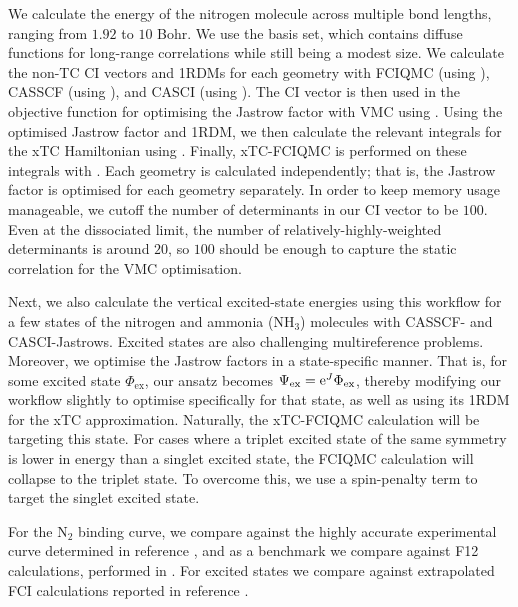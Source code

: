 We calculate the energy of the nitrogen molecule across multiple bond lengths, ranging from $1.92$ to $10$ Bohr. We use the \avtz basis set, which contains diffuse functions for long-range correlations while still being a modest size. We calculate the non-TC CI vectors and \glspl{1RDM} for each geometry with FCIQMC (using \neci),\supercite{gutherNECI2020} CASSCF (using \molpro),\supercite{wernerMOLPRO,wernerMolpro2012,wernerMolproQuantumChemistry2020} and CASCI (using \pyscf).\supercite{sunPySCF2018} The CI vector is then used in the objective function for optimising the Jastrow factor with VMC using \casino.\supercite{needsVariational2020} Using the optimised Jastrow factor and 1RDM, we then calculate the relevant integrals for the xTC Hamiltonian using \pytchint. Finally, xTC-FCIQMC is performed on these integrals with \neci. Each geometry is calculated independently; that is, the Jastrow factor is optimised for each geometry separately. In order to keep memory usage manageable, we cutoff the number of determinants in our CI vector to be $100$. Even at the dissociated limit, the number of relatively-highly-weighted determinants is around $20$, so $100$ should be enough to capture the static correlation for the VMC optimisation.

Next, we also calculate the vertical excited-state energies using this workflow for a few states of the nitrogen and ammonia (NH$_3$) molecules with CASSCF- and CASCI-Jastrows. Excited states are also challenging multireference problems. Moreover, we optimise the Jastrow factors in a state-specific manner. That is, for some excited state $\Phi_\mathrm{ex}$, our ansatz becomes $\Psi_\mathrm{ex} = \mathrm{e}^J\Phi_\mathrm{ex}$, thereby modifying our workflow slightly to optimise specifically for that state, as well as using its 1RDM for the xTC approximation. Naturally, the xTC-FCIQMC calculation will be targeting this state. For cases where a triplet excited state of the same symmetry is lower in energy than a singlet excited state, the FCIQMC calculation will collapse to the triplet state. To overcome this, we use a spin-penalty term to target the singlet excited state.\supercite{weserSpin2022}

For the N$_2$ binding curve, we compare against the highly accurate experimental curve determined in reference , and as a benchmark we compare against F12 calculations, performed in \molpro.\supercite{wernerMOLPRO,wernerMolpro2012,wernerMolproQuantumChemistry2020} For excited states we compare against extrapolated FCI calculations reported in reference .

